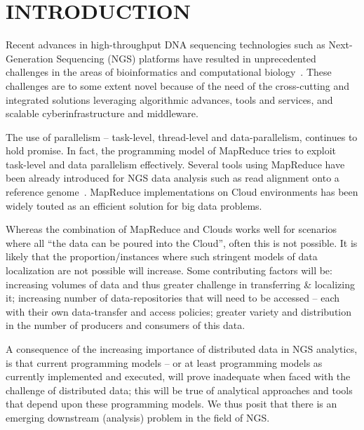 \documentclass{acm_proc_article-sp}
\begin{document}
\section{INTRODUCTION} 

Recent advances in high-throughput DNA sequencing technologies such as
Next-Generation Sequencing (NGS) platforms have resulted in
unprecedented challenges in the areas of bioinformatics and
computational
biology~\cite{metzker2010,1000genome,wang2009-natrevgen,alex2009,mcpherson2009}.
These challenges are to some extent novel because of the need of the
cross-cutting and integrated solutions leveraging algorithmic
advances, tools and services, and scalable cyberinfrastructure and
middleware.


The use of parallelism -- task-level, thread-level and
data-parallelism, continues to hold promise. In fact, the programming
model of MapReduce tries to exploit task-level and data parallelism
effectively.  Several tools using MapReduce have been already
introduced for NGS data analysis such as read alignment onto a
reference genome~\cite{cloudburst,
  gatk,langmead2009,seal2011,langmead2010, taylor2010}.  MapReduce
implementations on Cloud environments has been widely touted as an
efficient solution for big data
problems\cite{mapreduce-2004-dean,schatz-nature-biotech-2010,
  taylor2010}.

Whereas the combination of MapReduce and Clouds works well for
scenarios where all ``the data can be poured into the Cloud'', often
this is not possible.  It is likely that the proportion/instances
where such stringent models of data localization are not possible will
increase.  Some contributing factors will be: increasing volumes of
data and thus greater challenge in transferring \& localizing it;
increasing number of data-repositories that will need to be accessed
-- each with their own data-transfer and access policies; greater
variety and distribution in the number of producers and consumers of
this data. 

A consequence of the increasing importance of distributed data in NGS
analytics, is that current programming models -- or at least
programming models as currently implemented and executed, will prove
inadequate when faced with the challenge of distributed data; this
will be true of analytical approaches and tools that depend upon these
programming models. We thus posit that there is an emerging downstream
(analysis) problem in the field of NGS. 
\end{document}
